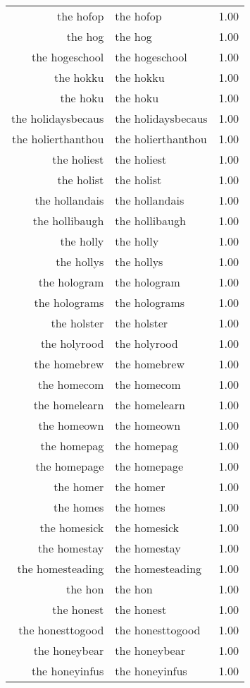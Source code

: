 \begin{table}[ht]
\begin{tabular}{rlr}
  the hofop & the hofop & 1.00 \\ 
  the hog & the hog & 1.00 \\ 
  the hogeschool & the hogeschool & 1.00 \\ 
  the hokku & the hokku & 1.00 \\ 
  the hoku & the hoku & 1.00 \\ 
  the holidaysbecaus & the holidaysbecaus & 1.00 \\ 
  the holierthanthou & the holierthanthou & 1.00 \\ 
  the holiest & the holiest & 1.00 \\ 
  the holist & the holist & 1.00 \\ 
  the hollandais & the hollandais & 1.00 \\ 
  the hollibaugh & the hollibaugh & 1.00 \\ 
  the holly & the holly & 1.00 \\ 
  the hollys & the hollys & 1.00 \\ 
  the hologram & the hologram & 1.00 \\ 
  the holograms & the holograms & 1.00 \\ 
  the holster & the holster & 1.00 \\ 
  the holyrood & the holyrood & 1.00 \\ 
  the homebrew & the homebrew & 1.00 \\ 
  the homecom & the homecom & 1.00 \\ 
  the homelearn & the homelearn & 1.00 \\ 
  the homeown & the homeown & 1.00 \\ 
  the homepag & the homepag & 1.00 \\ 
  the homepage & the homepage & 1.00 \\ 
  the homer & the homer & 1.00 \\ 
  the homes & the homes & 1.00 \\ 
  the homesick & the homesick & 1.00 \\ 
  the homestay & the homestay & 1.00 \\ 
  the homesteading & the homesteading & 1.00 \\ 
  the hon & the hon & 1.00 \\ 
  the honest & the honest & 1.00 \\ 
  the honesttogood & the honesttogood & 1.00 \\ 
  the honeybear & the honeybear & 1.00 \\ 
  the honeyinfus & the honeyinfus & 1.00 \\ 

\end{tabular}
\end{table}
